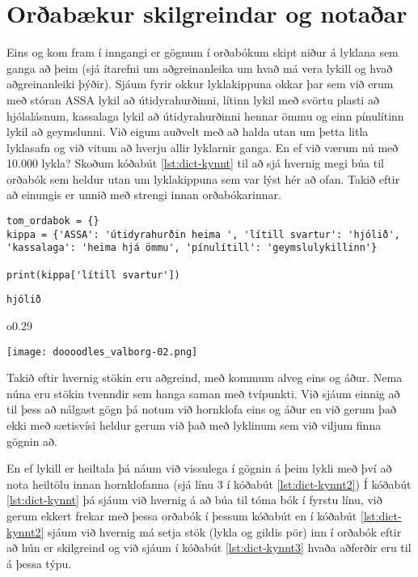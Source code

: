 \section{Orðabækur skilgreindar og notaðar}
Eins og kom fram í inngangi er gögnum í orðabókum skipt niður á lyklana sem ganga að þeim (sjá ítarefni um aðgreinanleika um hvað má vera lykill og hvað aðgreinanleiki þýðir).
Sjáum fyrir okkur lyklakippuna okkar þar sem við erum með stóran ASSA lykil að útidyrahurðinni, lítinn lykil með svörtu plasti að hjólalásnum, kassalaga lykil að útidyrahurðinni hennar ömmu og einn pínulítinn lykil að geymslunni.
Við eigum auðvelt með að halda utan um þetta litla lyklasafn og við vitum að hverju allir lyklarnir ganga.
En ef við værum nú með 10.000 lykla?
Skoðum kóðabút \ref{lst:dict-kynnt} til að sjá hvernig megi búa til orðabók sem heldur utan um lyklakippuna sem var lýst hér að ofan.
Takið eftir að einungis er unnið með strengi innan orðabókarinnar.

\begin{lstlisting}[caption=Orðabók kynnt með lyklakippusamlíkingu, label=lst:dict-kynnt]
tom_ordabok = {}
kippa = {'ASSA': 'útidyrahurðin heima ', 'lítill svartur': 'hjólið', 'kassalaga': 'heima hjá ömmu', 'pínulítill': 'geymslulykillinn'}

print(kippa['lítill svartur'])
\end{lstlisting}
\lstset{style=uttak}
\begin{lstlisting}
hjólið
\end{lstlisting}
\lstset{style=venjulegt}
 \begin{wrapfigure}{o}{0.29\textwidth} %
	\begin{center}
		\texttt{[image: doooodles\_valborg-02.png]}
	\end{center}
\end{wrapfigure}
\phantom{}

Takið eftir hvernig stökin eru aðgreind, með kommum alveg eins og áður.
Nema núna eru stökin tvenndir sem hanga saman með tvípunkti.
Við sjáum einnig að til þess að nálgast gögn þá notum við hornklofa eins og áður en við gerum það ekki með sætisvísi heldur gerum við það með lyklinum sem við viljum finna gögnin að.

En ef lykill er heiltala þá náum við vissulega í gögnin á þeim lykli með því að nota heiltölu innan hornklofanna (sjá línu 3 í kóðabút \ref{lst:dict-kynnt2})
Í kóðabút \ref{lst:dict-kynnt} þá sjáum við hvernig á að búa til tóma bók í fyrstu línu, við gerum ekkert frekar með þessa orðabók í þessum kóðabút en í kóðabút \ref{lst:dict-kynnt2} sjáum við hvernig má setja stök (lykla og gildis pör) inn í orðabók eftir að hún er skilgreind og við sjáum í kóðabút \ref{lst:dict-kynnt3} hvaða aðferðir eru til á þessa týpu.

